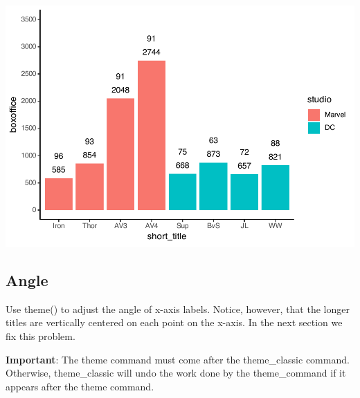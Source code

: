 \documentclass[
]{krantz}
\begin{document}
\includegraphics[width=0.65\linewidth]{bookdown_files/figure-latex/unnamed-chunk-124-1}

\hypertarget{angle}{%
\subsection{Angle}\label{angle}}

Use theme() to adjust the angle of x-axis labels. Notice, however, that the longer titles are vertically centered on each point on the x-axis. In the next section we fix this problem.

\textbf{Important}: The theme command must come after the theme\_classic command. Otherwise, theme\_classic will undo the work done by the theme\_command if it appears after the theme command.
\end{document}
